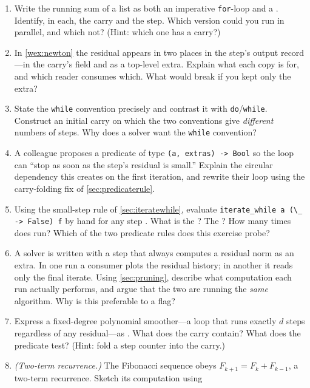 \exercisessection
\begin{enumerate}[nosep]
  \item Write the running sum of a list as both an imperative \texttt{for}-loop and
  a . Identify, in each, the carry and the step. Which version could
  you run in parallel, and which not? (Hint: which one has a carry?)
  \item In \cref{wex:newton} the residual appears in two places in
  the step's output record---in the carry's  field and as a
  top-level  extra. Explain what each copy is for, and which
  reader consumes which. What would break if you kept only the extra?
  \item State the \texttt{while} convention precisely and contrast it with
  \texttt{do}/\texttt{while}. Construct an initial carry on which the two
  conventions give \emph{different} numbers of steps. Why does a solver want the
  \texttt{while} convention?
  \item A colleague proposes a predicate of type
  \lstinline[style=l4style]|(a, extras) -> Bool| so the loop can ``stop as soon
  as the step's residual is small.'' Explain the circular dependency this creates
  on the first iteration, and rewrite their loop using the carry-folding fix of
  \cref{sec:predicaterule}.
  \item Using the small-step rule of \cref{sec:iteratewhile}, evaluate
  \lstinline[style=l4style]|iterate_while a (\_ -> False) f| by hand for any step
  . What is the ? The ? How many times
  does  run? Which of the two predicate rules does this exercise probe?
  \item A solver is written with a step that always computes a residual norm as an
  extra. In one run a consumer plots the residual history; in another it reads only
  the final iterate. Using \cref{sec:pruning}, describe what computation each run
  actually performs, and argue that the two are running the \emph{same} algorithm.
  Why is this preferable to a  flag?
  \item Express a fixed-degree polynomial smoother---a loop that runs exactly $d$
  steps regardless of any residual---as . What does the
  carry contain? What does the predicate test? (Hint: fold a step counter into the
  carry.)
  \item \emph{(Two-term recurrence.)} The Fibonacci sequence obeys
  $F_{k+1} = F_k + F_{k-1}$, a two-term recurrence. Sketch its computation using

\end{enumerate}
